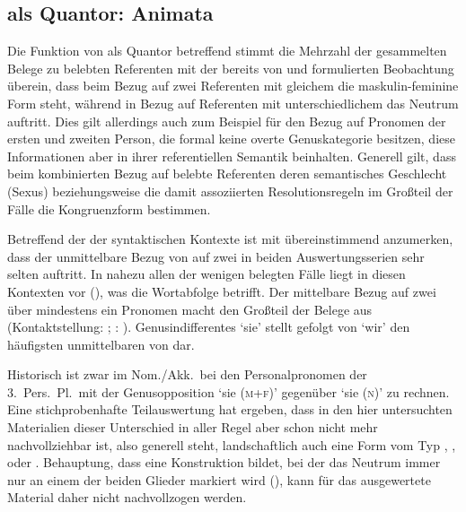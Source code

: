 \subsection{ als Quantor: Animata}

Die Funktion von  als Quantor betreffend stimmt die Mehrzahl der
gesammelten Belege zu belebten Referenten mit der bereits von
\citet[312]{grimm1890} und \citet[39--41]{behaghel1928} formulierten
Beobachtung überein, dass beim Bezug auf zwei Referenten mit gleichem
 die maskulin-feminine Form steht, während in Bezug auf Referenten
mit unterschiedlichem  das Neutrum auftritt. Dies gilt allerdings
auch zum Beispiel für den Bezug auf Pronomen der ersten und zweiten Person, die
formal keine overte Genuskategorie besitzen, diese Informationen aber in ihrer
referentiellen Semantik beinhalten. Generell gilt, dass beim kombinierten Bezug
auf belebte Referenten deren semantisches Geschlecht (Sexus) beziehungsweise
die damit assoziierten Resolutionsregeln im Großteil der Fälle die
Kongruenzform bestimmen.

Betreffend der  der syntaktischen Kontexte ist
mit \citet[624, Abbildung P~179]{ksw2} übereinstimmend anzumerken, dass der
unmittelbare Bezug von  auf zwei  in beiden
Auswertungsserien sehr selten auftritt. In nahezu allen der wenigen belegten
Fälle liegt in diesen Kontexten  vor
(), was die
Wortabfolge betrifft. Der mittelbare Bezug auf zwei  über
mindestens ein Pronomen macht den Großteil der Belege aus (Kontaktstellung:
; :
). Genus\-indifferentes  `sie'
stellt gefolgt von  `wir' den häufigsten unmittelbaren
 von  dar.

Historisch ist zwar im Nom./Akk.\ bei den Personalpronomen der
3.~Pers.\ Pl.\ mit der Genus\-opposition  `sie (\textsc{m+f})'
gegenüber  `sie (\textsc{n})' zu rechnen. Eine stichprobenhafte
Teilauswertung hat ergeben, dass in den hier untersuchten Materialien dieser
Unterschied in aller Regel aber schon nicht mehr nachvollziehbar ist, also
generell  steht, landschaftlich auch eine Form vom Typ
,
,
 oder
\autocites[vgl.][213--214]{paul2007}[369, 390--397]{ksw2}[482--483]{wmu1}.
 Behauptung, dass  eine
Konstruktion bildet, bei der das Neutrum immer nur an einem der beiden Glieder
markiert wird (), kann für das ausgewertete Material daher
nicht nachvollzogen werden.

